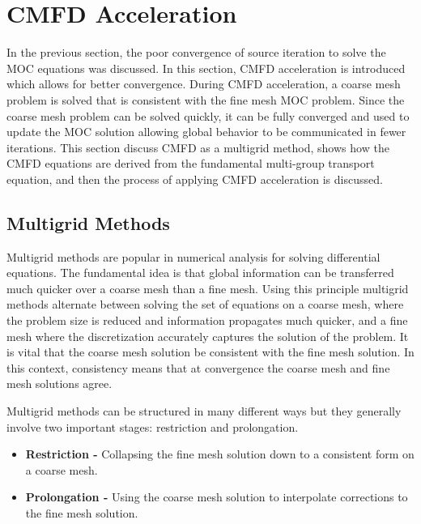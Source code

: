 \chapter{CMFD Acceleration}
\label{chap:cmfd}

In the previous section, the poor convergence of source iteration to solve the \ac{MOC} equations was discussed. In this section, \ac{CMFD} acceleration is introduced which allows for better convergence. During \ac{CMFD} acceleration, a coarse mesh problem is solved that is consistent with the fine mesh \ac{MOC} problem. Since the coarse mesh problem can be solved quickly, it can be fully converged and used to update the \ac{MOC} solution allowing global behavior to be communicated in fewer iterations. This section discuss \ac{CMFD} as a multigrid method, shows how the \ac{CMFD} equations are derived from the fundamental multi-group transport equation, and then the process of applying \ac{CMFD} acceleration is discussed.

\section{Multigrid Methods}
\label{sec:multigrid}

Multigrid methods are popular in numerical analysis for solving differential equations. The fundamental idea is that global information can be transferred much quicker over a coarse mesh than a fine mesh. Using this principle multigrid methods alternate between solving the set of equations on a coarse mesh, where the problem size is reduced and information propagates much quicker, and a fine mesh where the discretization accurately captures the solution of the problem. It is vital that the coarse mesh solution be consistent with the fine mesh solution. In this context, consistency means that at convergence the coarse mesh and fine mesh solutions agree.

Multigrid methods can be structured in many different ways but they generally involve two important stages: restriction and prolongation.
\begin{itemize}
	\item \textbf{Restriction - } Collapsing the fine mesh solution down to a consistent form on a coarse mesh.
	\item \textbf{Prolongation - } Using the coarse mesh solution to interpolate corrections to the fine mesh solution.
\end{itemize}

